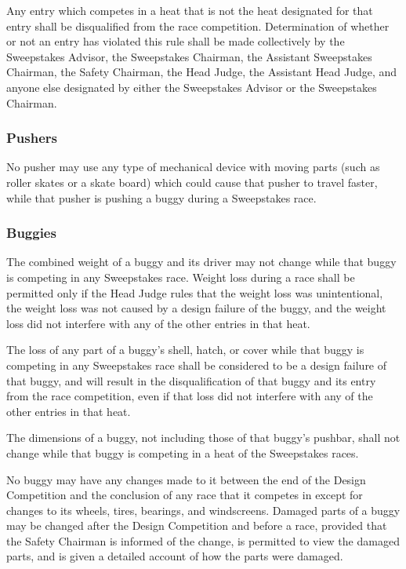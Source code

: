 	Any entry which competes in a heat that is not the heat designated for that
	entry shall be disqualified from the race competition. Determination of whether
	or not an entry has violated this rule shall be made collectively by the
	Sweepstakes Advisor, the Sweepstakes Chairman, the Assistant Sweepstakes
	Chairman, the Safety Chairman, the Head Judge, the Assistant Head Judge, and
	anyone else designated by either the Sweepstakes Advisor or the Sweepstakes
	Chairman.

\subsubsection{Pushers}

	No pusher may use any type of mechanical device with moving parts (such as
	roller skates or a skate board) which could cause that pusher to travel faster,
	while that pusher is pushing a buggy during a Sweepstakes race.

\subsubsection{Buggies}

	The combined weight of a buggy and its driver may not change while that buggy
	is competing in any Sweepstakes race. Weight loss during a race shall be
	permitted only if the Head Judge rules that the weight loss was unintentional,
	the weight loss was not caused by a design failure of the buggy, and the weight
	loss did not interfere with any of the other entries in that heat.

	The loss of any part of a buggy's shell, hatch, or cover while that buggy is
	competing in any Sweepstakes race shall be considered to be a design failure of
	that buggy, and will result in the disqualification of that buggy and its entry
	from the race competition, even if that loss did not interfere with any of the
	other entries in that heat.

	The dimensions of a buggy, not including those of that buggy's pushbar, shall
	not change while that buggy is competing in a heat of the Sweepstakes races.

	No buggy may have any changes made to it between the end of the Design
	Competition and the conclusion of any race that it competes in except for
	changes to its wheels, tires, bearings, and windscreens. Damaged parts of a
	buggy may be changed after the Design Competition and before a race, provided
	that the Safety Chairman is informed of the change, is permitted to view the
	damaged parts, and is given a detailed account of how the parts were damaged.

